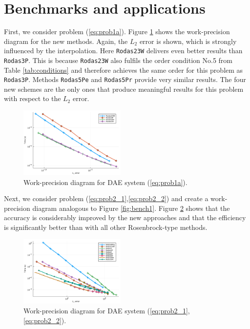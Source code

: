 \documentclass{juliacon}
\begin{document}
\section{Benchmarks and applications} \label{sec:bench}

First, we consider problem (\ref{eq:prob1a}). Figure \ref{fig:bench1a} shows the work-precision diagram for the new methods. Again, the $L_2$ error is shown, which is strongly 
influenced by the interpolation. Here \verb|Rodas23W| delivers even better results than \verb|Rodas3P|. This is because \verb|Rodas23W| also fulfils the order condition No.5 
from Table \ref{tab:conditions} and therefore achieves the same order for this problem as \verb|Rodas3P|. Methods \verb|Rodas5Pe| and \verb|Rodas5Pr| provide very similar results. The four new schemes are the only ones that produce meaningful results for 
this problem with respect to the $L_2$ error.

\begin{figure}
 \centering
 \includegraphics[width=0.47\textwidth]{Abb_1a.pdf}
 \caption{Work-precision diagram for DAE system (\ref{eq:prob1a}).}\label{fig:bench1a}
\end{figure}

Next, we consider problem (\ref{eq:prob2_1},\ref{eq:prob2_2}) and create a work-precision diagram analogous to Figure \ref{fig:bench1}. 
Figure \ref{fig:bench2a} shows that the accuracy is considerably improved by the new approaches and that the efficiency is significantly better 
than with all other Rosenbrock-type methods.

\begin{figure}
 \centering
 \includegraphics[width=0.47\textwidth]{Abb_2a.pdf}
 \caption{Work-precision diagram for DAE system (\ref{eq:prob2_1},\ref{eq:prob2_2}).}\label{fig:bench2a}
\end{figure}
\end{document}
